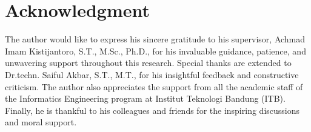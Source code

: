 \section*{Acknowledgment}
The author would like to express his sincere gratitude to his supervisor, Achmad Imam Kistijantoro, S.T., M.Sc., Ph.D., for his invaluable guidance, patience, and unwavering support throughout this research. Special thanks are extended to Dr.techn. Saiful Akbar, S.T., M.T., for his insightful feedback and constructive criticism. The author also appreciates the support from all the academic staff of the Informatics Engineering program at Institut Teknologi Bandung (ITB). Finally, he is thankful to his colleagues and friends for the inspiring discussions and moral support.
